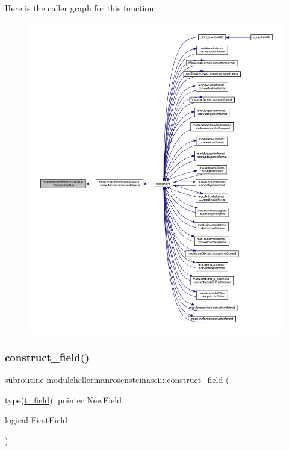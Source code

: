 Here is the caller graph for this function\+:\nopagebreak
\begin{figure}[H]
\begin{center}
\leavevmode
\includegraphics[width=350pt]{namespacemodulehellermanrosensteinascii_ada851e8286a0ae4a7c890a405aefca9e_icgraph}
\end{center}
\end{figure}
\mbox{\label{namespacemodulehellermanrosensteinascii_af3153ec18443db4efe86a28f2c87ad90}} 
\subsubsection{\texorpdfstring{construct\+\_\+field()}{construct\_field()}}
{\footnotesize\ttfamily subroutine modulehellermanrosensteinascii\+::construct\+\_\+field (\begin{DoxyParamCaption}\item[{type(\mbox{\hyperlink{structmodulehellermanrosensteinascii_1_1t__field}{t\+\_\+field}}), pointer}]{New\+Field,  }\item[{logical}]{First\+Field }\end{DoxyParamCaption})\hspace{0.3cm}{\ttfamily [private]}}

